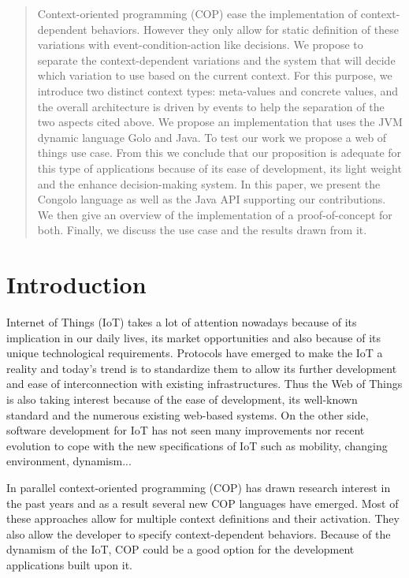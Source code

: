 \documentclass[a4paper]{article}
\begin{document}
\begin{abstract} 
Context-oriented programming (COP) ease the implementation of context-dependent behaviors. However they only allow for static definition of these variations with event-condition-action like decisions. We propose to separate the context-dependent variations and the system that will decide which variation to use based on the current context. For this purpose, we introduce two distinct context types: meta-values and concrete values, and the overall architecture is driven by events to help the separation of the two aspects cited above. We propose an implementation that uses the JVM dynamic language Golo and Java. To test our work we propose a web of things use case. From this we conclude that our proposition is adequate for this type of applications because of its ease of development, its light weight and the enhance decision-making system. In this paper, we present the Congolo language as well as the Java API supporting our contributions. We then give an overview of the implementation of a proof-of-concept for both. Finally, we discuss the use case and the results drawn from it.
\end{abstract}

\newpage

%
%

\section{Introduction}

Internet of Things (IoT) takes a lot of attention nowadays because of its implication in our daily lives, its market opportunities and also because of its unique technological requirements. Protocols have emerged to make the IoT a reality and today's trend is to standardize them to allow its further development and ease of interconnection with existing infrastructures. Thus the Web of Things is also taking interest because of the ease of development, its well-known standard and the numerous existing web-based systems. On the other side, software development for IoT has not seen many improvements nor recent evolution to cope with the new specifications of IoT such as mobility, changing environment, dynamism...

In parallel context-oriented programming (COP) has drawn research interest in the past years and as a result several new COP languages have emerged. Most of these approaches allow for multiple context definitions and their activation. They also allow the developer to specify context-dependent behaviors. Because of the dynamism of the IoT, COP could be a good option for the development applications built upon it.
\end{document}

